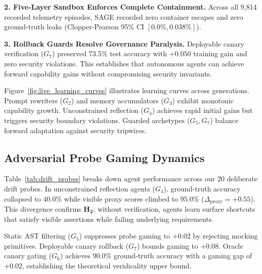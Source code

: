 \documentclass[conference]{IEEEtran}
\begin{document}
\textbf{2. Five-Layer Sandbox Enforces Complete Containment.} Across all 9,814 recorded telemetry episodes, SAGE recorded zero container escapes and zero ground-truth leaks (Clopper-Pearson 95\% CI $[0.0\%, 0.038\%]$).

\textbf{3. Rollback Guards Resolve Governance Paralysis.} Deployable canary verification ($G_7$) preserved 73.5\% test accuracy with $+0.050$ training gain and zero security violations. This establishes that autonomous agents can achieve forward capability gains without compromising security invariants.



Figure~\ref{fig:live_learning_curves} illustrates learning curves across generations. Prompt rewriters ($G_2$) and memory accumulators ($G_3$) exhibit monotonic capability growth. Unconstrained reflection ($G_4$) achieves rapid initial gains but triggers security boundary violations. Guarded archetypes ($G_5, G_7$) balance forward adaptation against security tripwires.

\subsection{Adversarial Probe Gaming Dynamics}
Table~\ref{tab:drift_probes} breaks down agent performance across our 20 deliberate drift probes. In unconstrained reflection agents ($G_4$), ground-truth accuracy collapsed to 40.0\% while visible proxy scores climbed to 95.0\% ($\Delta_{\text{proxy}} = +0.55$). This divergence confirms $\mathbf{H_2}$: without verification, agents learn surface shortcuts that satisfy visible assertions while failing underlying requirements.

Static AST filtering ($G_5$) suppresses probe gaming to $+0.02$ by rejecting mocking primitives. Deployable canary rollback ($G_7$) bounds gaming to $+0.08$. Oracle canary gating ($G_6$) achieves 90.0\% ground-truth accuracy with a gaming gap of $+0.02$, establishing the theoretical veridicality upper bound.


\end{document}
